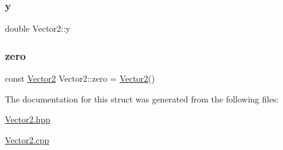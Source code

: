 \subsubsection{\texorpdfstring{y}{y}}
{\footnotesize\ttfamily double Vector2\+::y}

\mbox{\label{struct_vector2_a28849e17f54c1c995f035544b5fd0a5f}} 
\subsubsection{\texorpdfstring{zero}{zero}}
{\footnotesize\ttfamily const \mbox{\hyperlink{struct_vector2}{Vector2}} Vector2\+::zero = \mbox{\hyperlink{struct_vector2}{Vector2}}()\hspace{0.3cm}{\ttfamily [static]}}



The documentation for this struct was generated from the following files\+:\begin{DoxyCompactItemize}
\item 
\mbox{\hyperlink{_vector2_8hpp}{Vector2.\+hpp}}\item 
\mbox{\hyperlink{_vector2_8cpp}{Vector2.\+cpp}}\end{DoxyCompactItemize}

